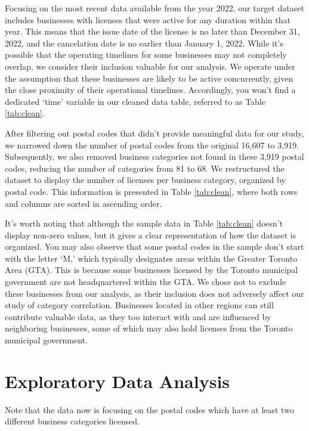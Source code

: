 \documentclass[
]{article}
\begin{document}
Focusing on the most recent data available from the year 2022, our target dataset includes businesses with licenses that were active for any duration within that year. This means that the issue date of the license is no later than December 31, 2022, and the cancelation date is no earlier than January 1, 2022. While it's possible that the operating timelines for some businesses may not completely overlap, we consider their inclusion valuable for our analysis. We operate under the assumption that these businesses are likely to be active concurrently, given the close proximity of their operational timelines. Accordingly, you won't find a dedicated `time' variable in our cleaned data table, referred to as Table \ref{tab:clean}.

After filtering out postal codes that didn't provide meaningful data for our study, we narrowed down the number of postal codes from the original 16,607 to 3,919. Subsequently, we also removed business categories not found in these 3,919 postal codes, reducing the number of categories from 81 to 68. We restructured the dataset to display the number of licenses per business category, organized by postal code. This information is presented in Table \ref{tab:clean}, where both rows and columns are sorted in ascending order.

It's worth noting that although the sample data in Table \ref{tab:clean} doesn't display non-zero values, but it gives a clear representation of how the dataset is organized. You may also observe that some postal codes in the sample don't start with the letter `M,' which typically designates areas within the Greater Toronto Area (GTA). This is because some businesses licensed by the Toronto municipal government are not headquartered within the GTA. We chose not to exclude these businesses from our analysis, as their inclusion does not adversely affect our study of category correlation. Businesses located in other regions can still contribute valuable data, as they too interact with and are influenced by neighboring businesses, some of which may also hold licenses from the Toronto municipal government.

\newpage

\hypertarget{exploratory-data-analysis}{%
\section{Exploratory Data Analysis}\label{exploratory-data-analysis}}

Note that the data now is focusing on the postal codes which have at least two different business categories licensed.
\end{document}
